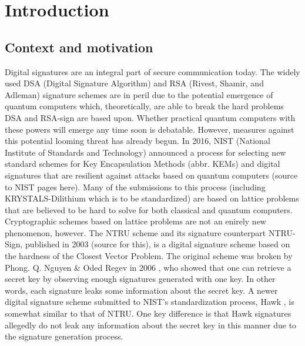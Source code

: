 \chapter{Introduction}
\section{Context and motivation}
Digital signatures are an integral part of secure communication today. The widely used DSA (Digital Signature Algorithm)
and RSA (Rivest, Shamir, and Adleman) signature schemes are in peril due to the potential emergence of quantum computers which, 
theoretically, are able to break the hard problems DSA and RSA-sign are based upon.
Whether practical quantum computers with these powers will emerge any time soon is debatable. However, measures against this potential looming threat has already begun. 
In 2016, NIST (National Institute of Standards and Technology) announced a process for selecting new standard schemes for Key Encapsulation Methods (abbr. KEMs) and 
digital signatures that are resilient against attacks based on quantum computers (source to NIST pages here). Many of the submissions to this process (including KRYSTALS-Dilithium which is to be standardized) 
are based on lattice problems that are believed to be hard to solve for both classical and quantum computers. \hfill \break \\

Cryptographic schemes based on lattice problems are not an enirely new phenomenon, however. The NTRU scheme and its signature counterpart NTRU-Sign, published in 2003 (source for this),
is a digital signature scheme based on the hardness of the Closest Vector Problem.
The original scheme was broken by Phong. Q. Nguyen \& Oded Regev in 2006 \cite{NR09}, who showed that one can retrieve a secret key by observing enough signatures generated with one key.
In other words, each signature leaks some information about the secret key.
A newer digital signature scheme submitted to NIST's standardization process, Hawk \cite{HawkSpec24}, is somewhat similar to that of NTRU.
One key difference is that Hawk signatures allegedly do not leak any information about the secret key in this manner due to the signature generation process.

